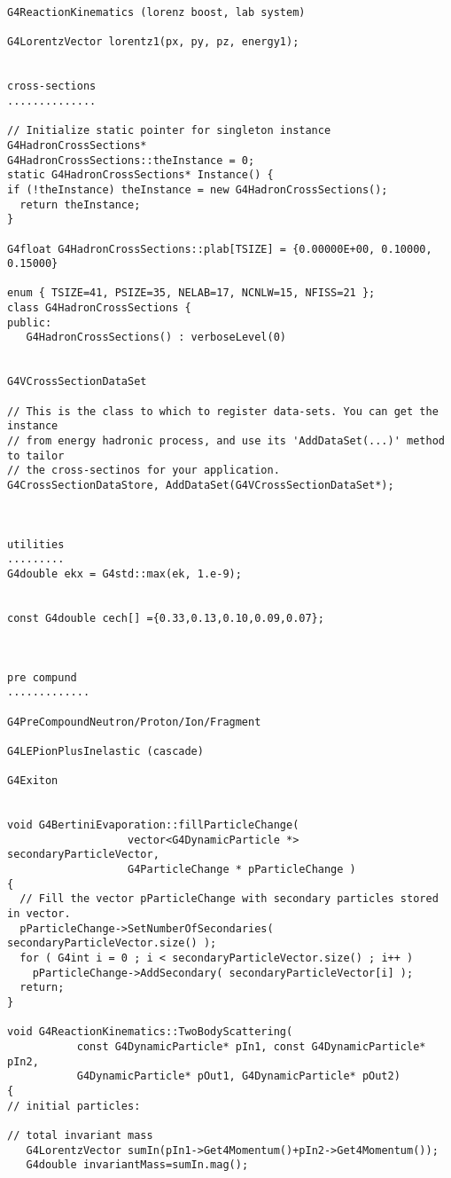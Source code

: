 \begin{verbatim}
G4ReactionKinematics (lorenz boost, lab system)

G4LorentzVector lorentz1(px, py, pz, energy1);


cross-sections
..............

// Initialize static pointer for singleton instance
G4HadronCrossSections* 
G4HadronCrossSections::theInstance = 0;
static G4HadronCrossSections* Instance() {
if (!theInstance) theInstance = new G4HadronCrossSections();
  return theInstance;
}

G4float G4HadronCrossSections::plab[TSIZE] = {0.00000E+00, 0.10000, 0.15000}

enum { TSIZE=41, PSIZE=35, NELAB=17, NCNLW=15, NFISS=21 };
class G4HadronCrossSections {
public:
   G4HadronCrossSections() : verboseLevel(0)


G4VCrossSectionDataSet 

// This is the class to which to register data-sets. You can get the instance
// from energy hadronic process, and use its 'AddDataSet(...)' method to tailor
// the cross-sectinos for your application.
G4CrossSectionDataStore, AddDataSet(G4VCrossSectionDataSet*);



utilities
.........
G4double ekx = G4std::max(ek, 1.e-9);


const G4double cech[] ={0.33,0.13,0.10,0.09,0.07};



pre compund
.............

G4PreCompoundNeutron/Proton/Ion/Fragment

G4LEPionPlusInelastic (cascade)

G4Exiton


void G4BertiniEvaporation::fillParticleChange( 
                   vector<G4DynamicParticle *> secondaryParticleVector,
                   G4ParticleChange * pParticleChange )
{
  // Fill the vector pParticleChange with secondary particles stored in vector.
  pParticleChange->SetNumberOfSecondaries( secondaryParticleVector.size() );
  for ( G4int i = 0 ; i < secondaryParticleVector.size() ; i++ )
    pParticleChange->AddSecondary( secondaryParticleVector[i] ); 
  return;
}

void G4ReactionKinematics::TwoBodyScattering(
           const G4DynamicParticle* pIn1, const G4DynamicParticle* pIn2,
           G4DynamicParticle* pOut1, G4DynamicParticle* pOut2)
{           
// initial particles:

// total invariant mass
   G4LorentzVector sumIn(pIn1->Get4Momentum()+pIn2->Get4Momentum());
   G4double invariantMass=sumIn.mag();


\end{verbatim}
